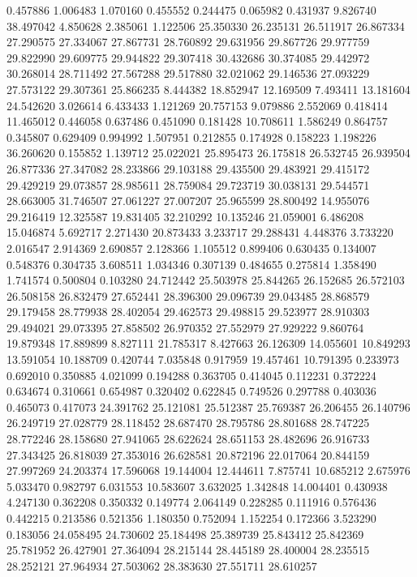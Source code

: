 0.457886
1.006483
1.070160
0.455552
0.244475
0.065982
0.431937
9.826740
38.497042
4.850628
2.385061
1.122506
25.350330
26.235131
26.511917
26.867334
27.290575
27.334067
27.867731
28.760892
29.631956
29.867726
29.977759
29.822990
29.609775
29.944822
29.307418
30.432686
30.374085
29.442972
30.268014
28.711492
27.567288
29.517880
32.021062
29.146536
27.093229
27.573122
29.307361
25.866235
8.444382
18.852947
12.169509
7.493411
13.181604
24.542620
3.026614
6.433433
1.121269
20.757153
9.079886
2.552069
0.418414
11.465012
0.446058
0.637486
0.451090
0.181428
10.708611
1.586249
0.864757
0.345807
0.629409
0.994992
1.507951
0.212855
0.174928
0.158223
1.198226
36.260620
0.155852
1.139712
25.022021
25.895473
26.175818
26.532745
26.939504
26.877336
27.347082
28.233866
29.103188
29.435500
29.483921
29.415172
29.429219
29.073857
28.985611
28.759084
29.723719
30.038131
29.544571
28.663005
31.746507
27.061227
27.007207
25.965599
28.800492
14.955076
29.216419
12.325587
19.831405
32.210292
10.135246
21.059001
6.486208
15.046874
5.692717
2.271430
20.873433
3.233717
29.288431
4.448376
3.733220
2.016547
2.914369
2.690857
2.128366
1.105512
0.899406
0.630435
0.134007
0.548376
0.304735
3.608511
1.034346
0.307139
0.484655
0.275814
1.358490
1.741574
0.500804
0.103280
24.712442
25.503978
25.844265
26.152685
26.572103
26.508158
26.832479
27.652441
28.396300
29.096739
29.043485
28.868579
29.179458
28.779938
28.402054
29.462573
29.498815
29.523977
28.910303
29.494021
29.073395
27.858502
26.970352
27.552979
27.929222
9.860764
19.879348
17.889899
8.827111
21.785317
8.427663
26.126309
14.055601
10.849293
13.591054
10.188709
0.420744
7.035848
0.917959
19.457461
10.791395
0.233973
0.692010
0.350885
4.021099
0.194288
0.363705
0.414045
0.112231
0.372224
0.634674
0.310661
0.654987
0.320402
0.622845
0.749526
0.297788
0.403036
0.465073
0.417073
24.391762
25.121081
25.512387
25.769387
26.206455
26.140796
26.249719
27.028779
28.118452
28.687470
28.795786
28.801688
28.747225
28.772246
28.158680
27.941065
28.622624
28.651153
28.482696
26.916733
27.343425
26.818039
27.353016
26.628581
20.872196
22.017064
20.844159
27.997269
24.203374
17.596068
19.144004
12.444611
7.875741
10.685212
2.675976
5.033470
0.982797
6.031553
10.583607
3.632025
1.342848
14.004401
0.430938
4.247130
0.362208
0.350332
0.149774
2.064149
0.228285
0.111916
0.576436
0.442215
0.213586
0.521356
1.180350
0.752094
1.152254
0.172366
3.523290
0.183056
24.058495
24.730602
25.184498
25.389739
25.843412
25.842369
25.781952
26.427901
27.364094
28.215144
28.445189
28.400004
28.235515
28.252121
27.964934
27.503062
28.383630
27.551711
28.610257
